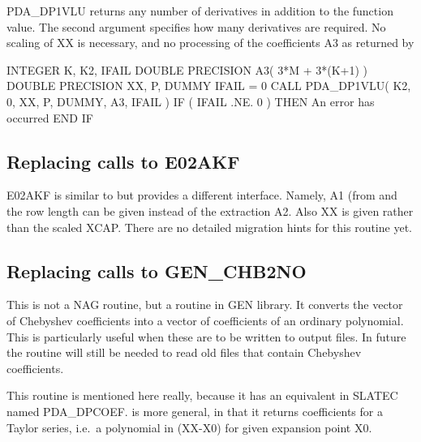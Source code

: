 \documentclass[11pt,twoside,nolof]{starlink}
\begin{document}
   PDA\_DP1VLU returns any number of derivatives in addition to the function
   value. The second argument specifies how many derivatives are
   required. No scaling of XX is necessary, and no processing of the
   coefficients A3 as returned by

\begin{terminalv}
      INTEGER K, K2, IFAIL
      DOUBLE PRECISION A3( 3*M + 3*(K+1) )
      DOUBLE PRECISION XX, P, DUMMY
      IFAIL = 0
      CALL PDA_DP1VLU( K2, 0, XX, P, DUMMY, A3, IFAIL )
      IF ( IFAIL .NE. 0 ) THEN
         An error has occurred
      END IF
\end{terminalv}


\subsection{Replacing calls to E02AKF}

   E02AKF is similar to
   but provides a different interface.
   Namely, A1 (from
   and the row length can be given instead of the extraction
   A2. Also XX is given rather than the scaled XCAP. There are no
   detailed migration hints for this routine yet.


\subsection{Replacing calls to GEN\_CHB2NO}

   This is not a NAG routine, but a routine in
   GEN library. It converts the vector of Chebyshev coefficients into a
   vector of coefficients of an ordinary polynomial. This is
   particularly useful when these are to be written to output files. In
   future the routine will still be needed to read old files that
   contain Chebyshev coefficients.

   This routine is mentioned here really, because it has an equivalent
   in SLATEC named PDA\_\-DPCOEF.
   is more general, in that it returns
   coefficients for a Taylor series, i.e.\ a polynomial in (XX-X0) for
   given expansion point X0.
\end{document}
